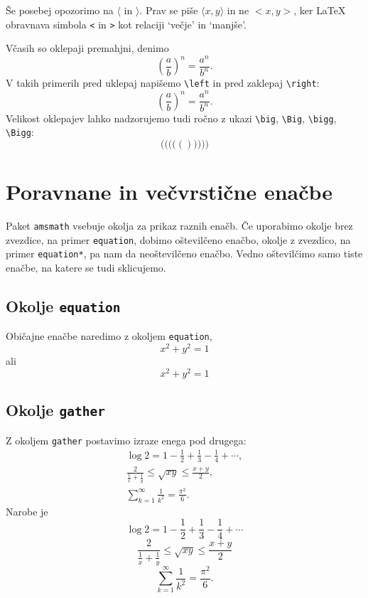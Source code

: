 \documentclass{amsart}
\begin{document}
Še posebej opozorimo na $\langle$ in $\rangle$. Prav se piše $\langle x, y\rangle$ in ne
$<x, y>$, ker {\LaTeX} obravnava simbola \texttt{<} in \texttt{>} kot relaciji `večje' in
`manjše'.

Včasih so oklepaji premahjni, denimo
%
\[
  (\frac{a}{b})^n = \frac{a^n}{b^n}.
\]
%
V takih primerih pred uklepaj napišemo \verb|\left| in pred zaklepaj \verb|\right|:
%
\[
  \left(\frac{a}{b}\right)^n = \frac{a^n}{b^n}.
\]
%
Velikost oklepajev lahko nadzorujemo tudi ročno z ukazi \verb|\big|, \verb|\Big|,
\verb|\bigg|, \verb|\Bigg|:
%
\[
  \Bigg( \bigg( \Big( \big( ( ) \big) \Big) \bigg) \Bigg)
\]


\section{Poravnane in večvrstične enačbe}
\label{sec:enacbe}

Paket \texttt{amsmath} vsebuje okolja za prikaz raznih enačb. Če uporabimo okolje brez
zvezdice, na primer \texttt{equation}, dobimo oštevilčeno enačbo, okolje z zvezdico, na
primer \texttt{equation*}, pa nam da neoštevilčeno enačbo. Vedno oštevilčimo samo tiste
enačbe, na katere se tudi sklicujemo.

\subsection{Okolje \texttt{equation}}

Običajne enačbe naredimo z okoljem \texttt{equation},
%
\begin{equation*}
  x^2 + y^2 = 1
\end{equation*}
%
ali
%
\begin{equation}
  \label{eq:1}
  x^2 + y^2 = 1
\end{equation}

\subsection{Okolje \texttt{gather}}

Z okoljem \texttt{gather} postavimo izraze enega pod drugega:
%
\begin{gather*}
  \log 2 = 1 - \frac{1}{2} + \frac{1}{3} - \frac{1}{4} + \cdots, \\
  \frac{2}{\frac{1}{x} + \frac{1}{y}} \leq \sqrt{x y} \leq \frac{x + y}{2}, \\
  \sum_{k = 1}^\infty \frac{1}{k^2} = \frac{\pi^2}{6}.
\end{gather*}
%
Narobe je
%
\[
  \log 2 = 1 - \frac{1}{2} + \frac{1}{3} - \frac{1}{4} + \cdots
\]
%
\[
  \frac{2}{\frac{1}{x} + \frac{1}{y}} \leq \sqrt{x y} \leq \frac{x + y}{2}
\]
%
\[
  \sum_{k = 1}^\infty \frac{1}{k^2} = \frac{\pi^2}{6}.
\]
\end{document}
